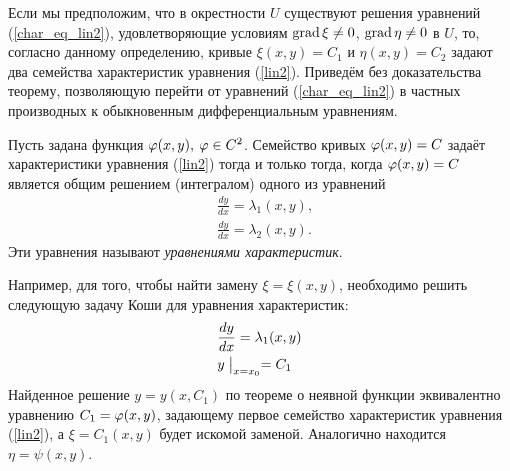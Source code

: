     Если мы предположим, что в окрестности $U$ существуют решения уравнений (\ref{char_eq_lin2}), удовлетворяющие условиям
    $\operatorname{grad} \xi \not= 0$, $\operatorname{grad} \eta \not= 0$ в $U$, то, согласно данному определению, кривые $\xi(x, y) = C_1$ и $\eta(x, y) = C_2$
    задают два семейства характеристик уравнения (\ref{lin2}). Приведём без доказательства теорему, позволяющую перейти от уравнений
    (\ref{char_eq_lin2}) в частных производных к обыкновенным дифференциальным уравнениям.
    \begin{theorem}
        Пусть задана функция $\varphi(x, y),\: \varphi \in C^2$. Семейство кривых $\varphi(x,y)=C$ задаёт характеристики уравнения (\ref{lin2}) тогда и
        только тогда, когда $\varphi(x, y) = C$ является общим решением (интегралом) одного из уравнений
        \begin{align*}
            & \frac{dy}{dx} = \lambda_1(x, y),\\
            & \frac{dy}{dx} = \lambda_2(x, y).
        \end{align*}
        Эти уравнения называют \textit{уравнениями характеристик}.
    \end{theorem}
    Например, для того, чтобы найти замену $\xi = \xi(x,y)$, необходимо решить следующую задачу Коши для уравнения характеристик:
    \begin{align*}
        & \frac{dy}{dx} = \lambda_1(x, y) \\
        & y \bigm|_{x = x_0} = C_1
    \end{align*}
    Найденное решение $y = y(x, C_1)$ по теореме о неявной функции эквивалентно уравнению $C_1 = \varphi(x, y)$, задающему первое семейство
    характеристик уравнения (\ref{lin2}), а $\xi = C_1(x, y)$ будет искомой заменой. Аналогично находится $\eta = \psi(x, y)$.
    

